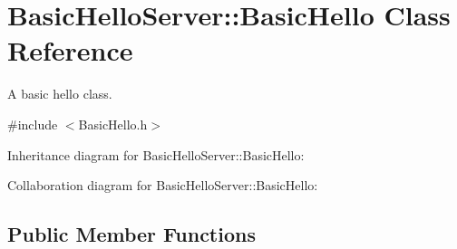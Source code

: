 \hypertarget{classBasicHelloServer_1_1BasicHello}{}\section{Basic\+Hello\+Server\+::Basic\+Hello Class Reference}
\label{classBasicHelloServer_1_1BasicHello}


A basic hello class.  




{\ttfamily \#include $<$Basic\+Hello.\+h$>$}



Inheritance diagram for Basic\+Hello\+Server\+::Basic\+Hello\+:


Collaboration diagram for Basic\+Hello\+Server\+::Basic\+Hello\+:
\subsection*{Public Member Functions}
